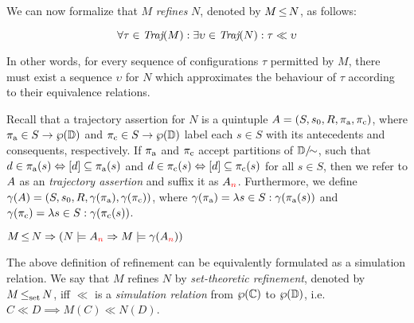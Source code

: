 

We can now formalize that $M$ \textit{refines} $N$, denoted by $M \operatorname{\leq} N$, as follows:

\begin{equation*}
\forall \tau \in \operatorname{\textit{Traj}}(M) : \exists \upsilon \in \operatorname{\textit{Traj}}(N) : \tau \ll \upsilon
\end{equation*}

\noindent In other words, for every sequence of configurations $\tau$ permitted by $M$, there must exist a sequence $\upsilon$ for $N$ which approximates the behaviour of $\tau$ according to their equivalence relations.

Recall that a trajectory assertion for $N$ is a quintuple $A = (S, s_{0}, R, \operatorname{\pi_{\textrm{a}}}, \operatorname{\pi_{\textrm{c}}})$, where $\operatorname{\pi_{\textrm{a}}} \in S \rightarrow \wp(\mathbb{D})$ and $\operatorname{\pi_{\textrm{c}}} \in S \rightarrow \wp(\mathbb{D})$ label each $s \in S$ with its antecedents and consequents, respectively. If $\operatorname{\pi_{\textrm{a}}}$ and $\operatorname{\pi_{\textrm{c}}}$ accept partitions of $\mathbb{D} / \mkern-8mu\sim$, such that $d \in \operatorname{\pi_{\textrm{a}}}(s) \Leftrightarrow [d] \subseteq \operatorname{\pi_{\textrm{a}}}(s)$ and $d \in \operatorname{\pi_{\textrm{c}}}(s) \Leftrightarrow [d] \subseteq \operatorname{\pi_{\textrm{c}}}(s)$ for all $s \in S$, then we refer to $A$ as an \textit{ trajectory assertion} and suffix it as $A_{\textcolor{red}{n}}$. Furthermore, we define $\gamma(A) = (S, s_{0}, R, \gamma(\operatorname{\pi_{\textrm{a}}}), \gamma(\operatorname{\pi_{\textrm{c}}}))$, where $\gamma(\operatorname{\pi_{\textrm{a}}}) = \lambda s \in S : \gamma(\operatorname{\pi_{\textrm{a}}}(s))$ and $\gamma(\operatorname{\pi_{\textrm{c}}}) = \lambda s \in S : \gamma(\operatorname{\pi_{\textrm{c}}}(s))$.


\begin{theorem} \label{thm:traj-refines}
$M \operatorname{\leq} N \Rightarrow (N \models A_{\textcolor{red}{n}} \Rightarrow M \models \gamma(A_{\textcolor{red}{n}}))$
\end{theorem}

The above definition of refinement can be equivalently formulated as a simulation relation. We say that $M$ refines $N$ by \textit{set-theoretic refinement}, denoted by $M \operatorname{\operatorname{\leq}_{\textrm{set}}} N$, iff $\ll$ is a \textit{simulation relation} from $\wp(\mathbb{C})$ to $\wp(\mathbb{D})$, i.e. $C \ll D \implies M(C) \ll N(D)$.

